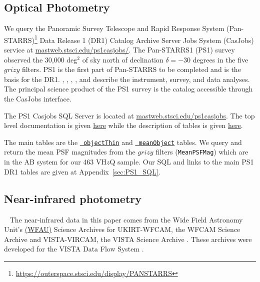 \documentclass[usenatbib]{mnras}
\begin{document}
        
\subsection{Optical Photometry}
We query the Panoramic Survey Telescope and Rapid Response System (Pan-STARRS)\footnote{\href{https://outerspace.stsci.edu/display/PANSTARRS}{https://outerspace.stsci.edu/display/PANSTARRS}} Data Release 1 (DR1) Catalog Archive Server Jobs System (CasJobs) service at \href{http://mastweb.stsci.edu/ps1casjobs/}{mastweb.stsci.edu/ps1casjobs/}. The Pan-STARRS1 (PS1) survey observed the 30,000 deg$^{2}$ of sky north of declination $\delta = -30$ degrees in the five $grizy$ filters. PS1 is the first part of Pan-STARRS to be completed and is the basis for the DR1. \citet{Chambers2016}, \citet{Magnier2016a}, \citet{Waters2016}, \citet{Magnier2016b}, \citet{Magnier2016c} and \citet{Flewelling2016} describe the instrument, survey, and data analyses. The principal science product of the PS1 survey is the catalog accessible through the CasJobs interface.

The PS1 Casjobs SQL Server is located at
\href{http://mastweb.stsci.edu/ps1casjobs}{mastweb.stsci.edu/ps1casjobs}.
The top level documentation is given
\href{https://outerspace.stsci.edu/display/PANSTARRS/PS1+Source+extraction+and+catalogs}{here}
while the description of tables is given
\href{https://outerspace.stsci.edu/display/PANSTARRS/PS1+Source+extraction+and+catalogs#PS1Sourceextractionandcatalogs}{here}.

The main tables are the
\href{https://outerspace.stsci.edu/display/PANSTARRS/PS1+ObjectThin+table+fields}{{\tt
objectThin}} and
\href{https://outerspace.stsci.edu/display/PANSTARRS/PS1+MeanObject+table+fields}{{\tt
meanObject}} tables.  We query and return the mean PSF magnitudes from
the $grizy$ filters ({\tt MeanPSFMag}) which are in the AB system for
our 463 VH$z$Q sample. Our SQL and links to the main PS1 DR1 tables
are given at  Appendix~\ref{sec:PS1_SQL}.

    
\subsection{Near-infrared photometry}~\label{sec:NIR_data} 
The near-infrared data in this paper comes from the Wide Field
Astronomy Unit's \href{https://www.roe.ac.uk/ifa/wfau/}{(WFAU)}
Science Archives for UKIRT-WFCAM, the WFCAM Science Archive
\citep[WSA; ][]{Hambly2008} and VISTA-VIRCAM, the VISTA Science
Archive \citep[VSA; ][]{Cross2012}. These archives were developed for
the VISTA Data Flow System \citep[VDFS][]{VDFS}.
\end{document}
